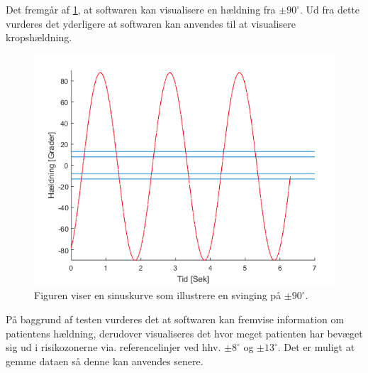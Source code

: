 Det fremgår af \ref{Fig:software_sinus}, at softwaren kan visualisere en hældning fra $\pm90^{\circ}$. Ud fra dette vurderes det yderligere at softwaren kan anvendes til at visualisere kropshældning. 

\begin{figure}[H] 
	\centering 
	\includegraphics[scale=0.5]{figures/cProblemloesning/sinus.PNG}
	\caption{Figuren viser en sinuskurve som illustrere en svinging på $\pm90^{\circ}$.}
	\label{Fig:software_sinus}
\end{figure}

På baggrund af testen vurderes det at softwaren kan fremvise information om patientens hældning, derudover visualiseres det hvor meget patienten har bevæget sig ud i risikozonerne via. referencelinjer ved hhv. $\pm8^{\circ}$ og $\pm13^{\circ}$. Det er muligt at gemme dataen så denne kan anvendes senere.
